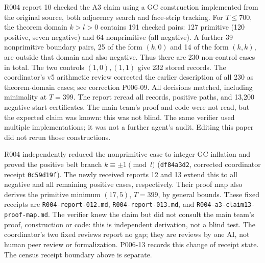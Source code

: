 \documentclass[11pt]{amsart}
\newcommand{\record}[1]{\nolinkurl{#1}}
\begin{document}
R004 report 10 checked the A3 claim using a GC construction implemented
from the original source, both adjacency search and face-strip tracking.
For $T\le700$, the theorem domain $k>l>0$ contains 191 checked pairs:
127 primitive (120 positive, seven negative) and 64 nonprimitive
(all negative). A further 39 nonprimitive boundary pairs, 25 of the form
$(k,0)$ and 14 of the form $(k,k)$, are outside that domain and also
negative. Thus there are 230 non-control cases in total. The two controls
$(1,0),(1,1)$ give 232 stored records. The coordinator's v5 arithmetic
review corrected the earlier description of all 230 as theorem-domain
cases; see correction P006-09. All decisions matched, including
minimality at $T=399$. The report reread all records, positive paths,
and 13,200 negative-start certificates. The main team's proof and code
were not read, but the expected claim was known: this was not blind.
The same verifier used multiple implementations; it was not a further
agent's audit. Editing this paper did not rerun those constructions.

R004 independently reduced the nonprimitive case to integer GC
inflation and proved the positive belt branch $k\equiv\pm1\pmod l$
(\record{df84a3d2}, corrected coordinator receipt \record{0c59d19f}).
The newly received reports 12 and 13 extend this to all negative and
all remaining positive cases, respectively. Their proof map also derives
the primitive minimum $(17,5)$, $T=399$, by general bounds.
These fixed receipts are \record{R004-report-012.md},
\record{R004-report-013.md}, and \record{R004-a3-claim13-proof-map.md}.
The verifier knew the claim but did not consult the main team's proof,
construction or code: this is independent derivation, not a blind test.
The coordinator's two fixed reviews report no gap; they are reviews by
one AI, not human peer review or formalization. P006-13 records this
change of receipt state. The census receipt boundary above is separate.
\end{document}
